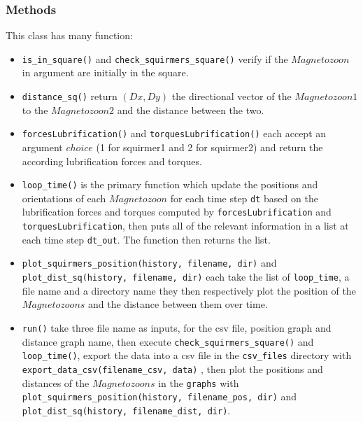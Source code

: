 \documentclass{article}
\begin{document}
\subsubsection*{Methods}
This class has many function:
\begin{itemize}
   \item \texttt{is\_in\_square()} and \texttt{check\_squirmers\_square()} verify if the $Magnetozoon$ 
   in argument are initially in the square.
   \item \texttt{distance\_sq()} return $(Dx, Dy)$ the directional vector of the $Magnetozoon1$ to the $Magnetozoon2$ 
   and the distance between the two.
   \item \texttt{forcesLubrification()} and \texttt{torquesLubrification()} each accept an argument $choice$ (1 for squirmer1 and 2 for squirmer2)
   and return the according lubrification forces and torques.
   \item \texttt{loop\_time()} is the primary function which update the positions and orientations of each $Magnetozoon$
   for each time step \texttt{dt} based on the lubrification forces and torques computed by \texttt{forcesLubrification}
   and \texttt{torquesLubrification}, then puts all of the relevant information in a list
   at each time step \texttt{dt\_out}. The function then returns the list.
   \item \texttt{plot\_squirmers\_position(history, filename, dir)} and \texttt{plot\_dist\_sq(history, filename, dir)} 
   each take the list of \texttt{loop\_time}, a file name and a directory name
   they then respectively plot the position of the $Magnetozoons$ and the distance between them over time.
   \item \texttt{run()} take three file name as inputs, for the csv file, position graph and distance graph name, 
   then execute \texttt{check\_squirmers\_square()} and \texttt{loop\_time()},
   export the data into a csv file in the \texttt{csv\_files} directory with \texttt{export\_data\_csv(filename\_csv, data)} 
   , then plot the positions and distances of the $Magnetozoons$ in the \texttt{graphs} with \texttt{plot\_squirmers\_position(history, filename\_pos, dir)}
   and \texttt{plot\_dist\_sq(history, filename\_dist, dir)}.
\end{itemize}



\newpage

\nocite{*}


\end{document}
